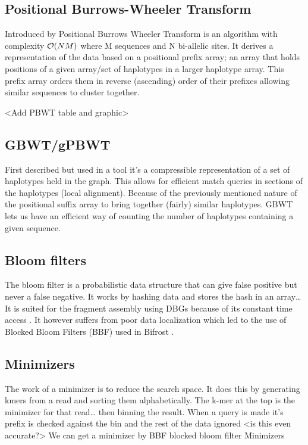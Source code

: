 \documentclass[11pt]{article}
\begin{document}
\subsection{Positional Burrows-Wheeler Transform}
\label{sec:org1ad13fe}
Introduced by \cite{durbinEfficientHaplotypeMatching2014} Positional Burrows 
Wheeler Transform is an algorithm with complexity \(\mathcal{O}(NM)\) where M sequences
and N bi-allelic sites.
It derives a representation of the data based on a positional prefix array; an
array that holds positions of a given array/set of haplotypes in a larger 
haplotype array. This prefix array orders them in reverse (ascending) order of
their prefixes allowing similar sequences to cluster together.

<Add PBWT table and graphic>

\subsection{GBWT/gPBWT}
\label{sec:orgd561c0b}
First described \cite{novakGraphExtensionPositional2017} but used in a tool
\cite{sirenHaplotypeawareGraphIndexes2020} it’s a compressible representation of 
a set of haplotypes held in the graph. This allows for efficient match queries 
in sections of the haplotypes (local alignment). Because of the previously
mentioned nature of the positional suffix array to bring together (fairly) 
similar haplotypes.
GBWT lets us have an efficient way of counting the number of haplotypes 
containing a given sequence.

\subsection{Bloom filters}
\label{sec:org45ec357}
The bloom filter is a probabilistic data structure that can give false positive
but never a false negative.  It works by hashing data and stores the hash in an
array\ldots{}
It is suited for the fragment assembly using DBGs because of its constant time
access \cite{chikhiSpaceefficientExactBruijn2013}. It however suffers from poor
data localization  which led to the use of Blocked Bloom Filters (BBF) 
\cite{putzeCacheHashSpaceefficient2010} used in
Bifrost \cite{holleyBifrostHighlyParallel2019}.

\subsection{Minimizers}
\label{sec:org58ad01f}
The work of a minimizer is to reduce the search space. It does this by generating
kmers from a read and sorting them alphabetically. The k-mer at the top is the
minimizer for that read\ldots{} then binning the result. When a query is made it’s
prefix is checked against the bin and the rest of the data ignored
<is this even accurate?>
We can get a minimizer by BBF blocked bloom filter Minimizers
\cite{grabowskiDiskbasedCompressionData2015,robertsReducingStorageRequirements2004}
\end{document}
